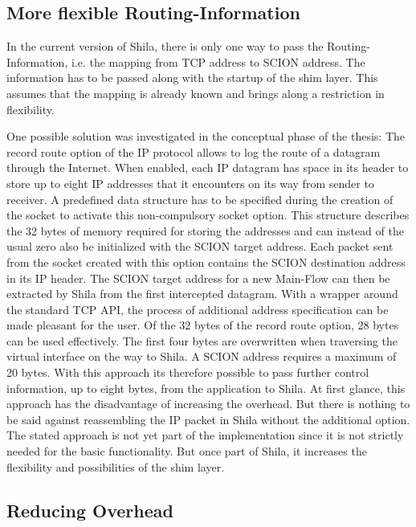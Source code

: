 \subsection*{More flexible Routing-Information}

In the current version of Shila, there is only one way to pass the Routing-Information, i.e. the mapping from TCP address to SCION address. The information has to be passed along with the startup of the shim layer. This assumes that the mapping is already known and brings along a restriction in flexibility.  

One possible solution was investigated in the conceptual phase of the thesis: The record route option of the IP protocol allows to log the route of a datagram through the Internet. When enabled, each IP datagram has space in its header to store up to eight IP addresses that it encounters on its way from sender to receiver. A predefined data structure has to be specified during the creation of the socket to activate this non-compulsory socket option. This structure describes the 32 bytes of memory required for storing the addresses and can instead of the usual zero also be initialized with the SCION target address. Each packet sent from the socket created with this option contains the SCION destination address in its IP header. The SCION target address for a new Main-Flow can then be extracted by Shila from the first intercepted datagram. With a wrapper around the standard TCP API, the process of additional address specification can be made pleasant for the user. Of the 32 bytes of the record route option, 28 bytes can be used effectively. The first four bytes are overwritten when traversing the virtual interface on the way to Shila. A SCION address requires a maximum of 20 bytes. With this approach its therefore possible to pass further control information, up to eight bytes, from the application to Shila. At first glance, this approach has the disadvantage of increasing the overhead. But there is nothing to be said against reassembling the IP packet in Shila without the additional option. The stated approach is not yet part of the implementation since it is not strictly needed for the basic functionality. But once part of Shila, it increases the flexibility and possibilities of the shim layer.

\subsection*{Reducing Overhead}

